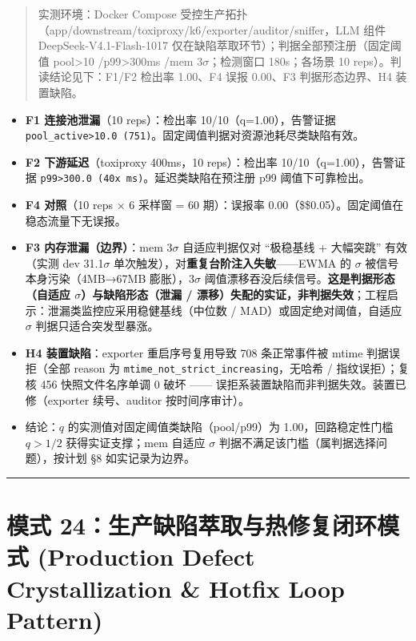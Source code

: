 \begin{quote}
实测环境：Docker Compose
受控生产拓扑（app/downstream/toxiproxy/k6/exporter/auditor/sniffer，LLM
组件 DeepSeek-V4.1-Flash-1017
仅在缺陷萃取环节）；判据全部预注册（固定阈值 pool\textgreater10
/p99\textgreater300ms /mem 3\(\sigma\)；检测窗口 180s；各场景 10
reps）。判读结论见下：F1/F2 检出率 1.00、F4 误报 0.00、F3
判据形态边界、H4 装置缺陷。
\end{quote}

\begin{itemize}
\item
  \textbf{F1 连接池泄漏}（10 reps）：检出率 10/10（q=1.00），告警证据
  \texttt{pool\_active\textgreater{}10.0\ (751)}。固定阈值判据对资源池耗尽类缺陷有效。
\item
  \textbf{F2 下游延迟}（toxiproxy 400ms，10 reps）：检出率
  10/10（q=1.00），告警证据
  \texttt{p99\textgreater{}300.0\ (40x\ ms)}。延迟类缺陷在预注册 p99
  阈值下可靠检出。
\item
  \textbf{F4 对照}（10 reps × 6 采样窗 = 60 期）：误报率
  0.00（\$\le\$0.05）。固定阈值在稳态流量下无误报。
\item
  \textbf{F3 内存泄漏（边界）}：mem 3\(\sigma\) 自适应判据仅对
  ``极稳基线 + 大幅突跳'' 有效（实测 dev 31.1\(\sigma\)
  单次触发），对\textbf{重复台阶注入失敏}------EWMA 的 \(\sigma\)
  被信号本身污染（4MB→67MB 膨胀），3\(\sigma\)
  阈值漂移吞没后续信号。\textbf{这是判据形态（自适应
  \(\sigma\)）与缺陷形态（泄漏 /
  漂移）失配的实证，非判据失效}；工程启示：泄漏类监控应采用稳健基线（中位数
  / MAD）或固定绝对阈值，自适应 \(\sigma\) 判据只适合突发型暴涨。
\item
  \textbf{H4 装置缺陷}：exporter 重启序号复用导致 708 条正常事件被 mtime
  判据误拒（全部 reason 为
  \texttt{mtime\_not\_strict\_increasing}，无哈希 / 指纹误拒）；复核 456
  快照文件名序单调 0 破坏 ------
  误拒系装置缺陷而非判据失效。装置已修（exporter 续号、auditor
  按时间序审计）。
\item
  结论：\(q\) 的实测值对固定阈值类缺陷（pool/p99）为
  1.00，回路稳定性门槛 \(q>1/2\) 获得实证支撑；mem 自适应 \(\sigma\)
  判据不满足该门槛（属判据选择问题），按计划 §8 如实记录为边界。
\end{itemize}

\begin{center}\rule{0.5\linewidth}{0.5pt}\end{center}

\section{模式 24：生产缺陷萃取与热修复闭环模式 (Production Defect
Crystallization \& Hotfix Loop
Pattern)}\label{ux6a21ux5f0f-24ux751fux4ea7ux7f3aux9677ux8403ux53d6ux4e0eux70edux4feeux590dux95edux73afux6a21ux5f0f-production-defect-crystallization-hotfix-loop-pattern}

